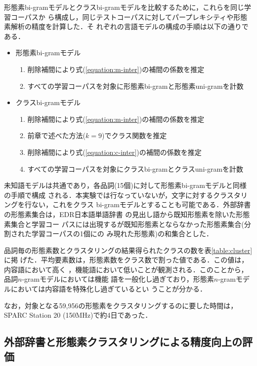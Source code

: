 

形態素bi-gramモデルとクラスbi-gramモデルを比較するために，これらを同じ学習コーパスか
ら構成し，同じテストコーパスに対してパープレキシティや形態素解析の精度を計算した．そ
れぞれの言語モデルの構成の手順は以下の通りである．
\begin{itemize}
\item 形態素bi-gramモデル
  \begin{enumerate}
  \item 削除補間により式(\ref{equation:m-inter})の補間の係数を推定
  \item すべての学習コーパスを対象に形態素bi-gramと形態素uni-gramを計数
  \end{enumerate}
\item クラスbi-gramモデル
  \begin{enumerate}
  \item 削除補間により式(\ref{equation:m-inter})の補間の係数を推定
  \item 前章で述べた方法($k=9$)でクラス関数を推定
  \item 削除補間により式(\ref{equation:c-inter})の補間の係数を推定
  \item すべての学習コーパスを対象にクラスbi-gramとクラスuni-gramを計数
  \end{enumerate}
\end{itemize}
未知語モデルは共通であり，各品詞(15個)に対して形態素bi-gramモデルと同様の手順で構成
される．本実験では行なっていないが，文字に対するクラスタリングを行ない，これをクラス
bi-gramモデルとすることも可能である．外部辞書の形態素集合は，EDR日本語単語辞書
\cite{EDR.電子化辞書仕様説明書}の見出し語から既知形態素を除いた形態素集合と学習コー
パスには出現するが既知形態素とならなかった形態素集合(分割された学習コーパスの1個にの
み現れた形態素)の和集合とした．



品詞毎の形態素数とクラスタリングの結果得られたクラスの数を表\ref{table:cluster}に掲
げた．平均要素数は，形態素数をクラス数で割った値である．この値は，内容語において高く
，機能語において低いことが観測される．このことから，品詞$n$-gramモデルにおいては機能
語を一般化し過ぎており，形態素$n$-gramモデルにおいては内容語を特殊化し過ぎているとい
うことが分かる．

なお，対象となる59,956の形態素をクラスタリングするのに要した時間は，SPARC Station
20 (150MHz)で約4日であった．



\subsection{外部辞書と形態素クラスタリングによる精度向上の評価}

